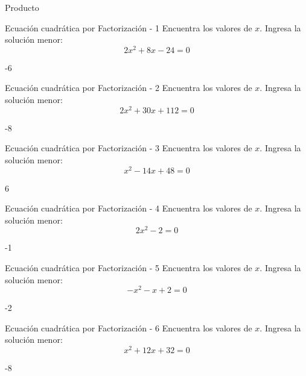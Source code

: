 \documentclass[a4,11pt]{aleph-notas}
\begin{document}
\begin{quiz}{Producto}

\begin{numerical}[]%
    {Ecuación cuadrática por Factorización - 1}
    Encuentra los valores de $x$. Ingresa la solución menor:
    \[
        2 x^{2} + 8 x - 24 = 0
    \]
    \item[] -6
\end{numerical}

\begin{numerical}[]%
    {Ecuación cuadrática por Factorización - 2}
    Encuentra los valores de $x$. Ingresa la solución menor:
    \[
        2 x^{2} + 30 x + 112 = 0
    \]
    \item[] -8
\end{numerical}

\begin{numerical}[]%
    {Ecuación cuadrática por Factorización - 3}
    Encuentra los valores de $x$. Ingresa la solución menor:
    \[
        x^{2} - 14 x + 48 = 0
    \]
    \item[] 6
\end{numerical}

\begin{numerical}[]%
    {Ecuación cuadrática por Factorización - 4}
    Encuentra los valores de $x$. Ingresa la solución menor:
    \[
        2 x^{2} - 2 = 0
    \]
    \item[] -1
\end{numerical}

\begin{numerical}[]%
    {Ecuación cuadrática por Factorización - 5}
    Encuentra los valores de $x$. Ingresa la solución menor:
    \[
        - x^{2} - x + 2 = 0
    \]
    \item[] -2
\end{numerical}

\begin{numerical}[]%
    {Ecuación cuadrática por Factorización - 6}
    Encuentra los valores de $x$. Ingresa la solución menor:
    \[
        x^{2} + 12 x + 32 = 0
    \]
    \item[] -8
\end{numerical}


\end{quiz}
\end{document}
